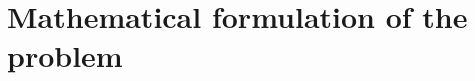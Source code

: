 \documentclass[11pt,a4paper]{article}
\begin{document}



\section{Mathematical formulation of the problem}\label{sec:introduction}
\end{document}
